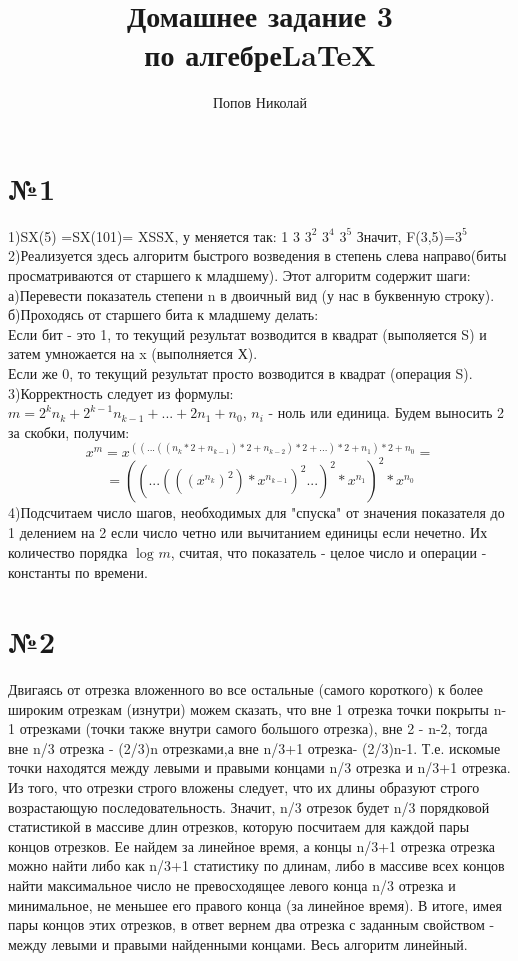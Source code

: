 \documentclass[a4paper,12pt]{article} %
\author{Попов Николай}
\title{Домашнее задание 3 \\ по алгебре\LaTeX{}}
\begin{document}

\maketitle 
\newpage 

\section*{№1}
1)SX(5) =SX(101)= XSSX, у меняется так: 1 3 $3^{2}$ $3^{4}$ $3^{5}$ Значит, F(3,5)=$3^{5}$
2)Реализуется здесь алгоритм быстрого возведения в степень слева направо(биты просматриваются от старшего к младшему). Этот алгоритм содержит шаги:\\
а)Перевести показатель степени n в двоичный вид (у нас в буквенную строку).
б)Проходясь от старшего бита к младшему делать:\\
Если бит - это 1, то текущий результат возводится в квадрат (выполяется S) и затем умножается на x (выполняется Х).\\
 Если же 0, то текущий результат просто возводится в квадрат (операция S). \\
 3)Корректность следует из формулы:\\
 $m=2^{k}n_{k}+2^{k-1}n_{k-1}+...+2n_{1}+n_{0}$, $n_{i}$ - ноль или единица. Будем выносить 2 за скобки, получим:\\
 \[
 x^{m}=x^{((...((n_{k}*2+n_{k-1})*2+n_{k-2})*2+...)*2+n_{1})*2+n_{0}}=
 \]
 \[=((...(((x^{n_{k}})^{2})*x^{n_{k-1}})^{2}...)^{2}*x^{n_{1}})^{2}*x^{n_{0}}\]
 4)Подсчитаем число шагов, необходимых для "спуска" от значения показателя до 1 делением на 2 если число четно или вычитанием единицы если нечетно. Их количество порядка $\log_{}{m}$, считая, что показатель - целое число и операции - константы по времени.  \\
 \section*{№2}
  Двигаясь от отрезка вложенного во все остальные (самого короткого) к более широким отрезкам (изнутри) можем сказать, что вне 1 отрезка точки покрыты n-1 отрезками (точки также внутри самого большого отрезка), вне 2 - n-2, тогда вне n/3 отрезка  - (2/3)n отрезками,а вне n/3+1 отрезка- (2/3)n-1. Т.е. искомые точки находятся между левыми и правыми концами n/3 отрезка и n/3+1 отрезка. Из того, что отрезки строго вложены следует, что их длины образуют строго возрастающую последовательность. Значит, n/3 отрезок будет n/3 порядковой статистикой в массиве длин отрезков, которую посчитаем для каждой пары концов отрезков. Ее найдем за линейное время, а концы n/3+1 отрезка отрезка можно найти либо как   n/3+1 статистику по длинам, либо в массиве всех концов найти максимальное число не превосходящее левого конца  n/3 отрезка и минимальное, не меньшее его правого конца (за линейное время). В итоге, имея пары концов этих отрезков, в ответ вернем два отрезка с заданным свойством - между левыми и правыми найденными концами. Весь алгоритм линейный.\\
\end{document}
